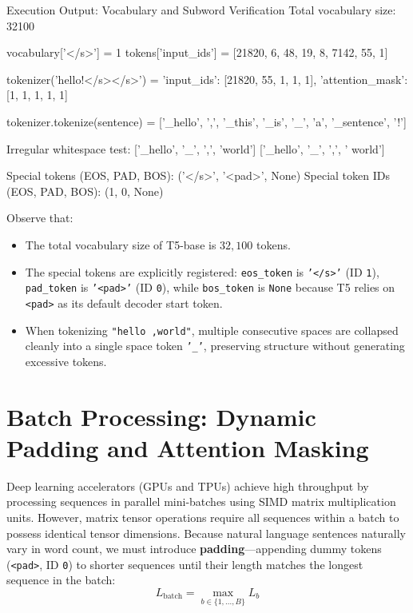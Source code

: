 \documentclass[11pt,a4paper]{article}
\begin{document}
\begin{macterminal}{Execution Output: Vocabulary and Subword Verification}
Total vocabulary size: 32100

vocabulary['</s>'] = 1
tokens['input_ids'] = [21820, 6, 48, 19, 8, 7142, 55, 1]

tokenizer('hello!</s></s>') = {'input_ids': [21820, 55, 1, 1, 1], 'attention_mask': [1, 1, 1, 1, 1]}

tokenizer.tokenize(sentence) = ['_hello', ',', '_this', '_is', '_', 'a', '_sentence', '!']

Irregular whitespace test:
['_hello', '_', ',', 'world']
['_hello', '_', ',', ' world']

Special tokens (EOS, PAD, BOS): ('</s>', '<pad>', None)
Special token IDs (EOS, PAD, BOS): (1, 0, None)
\end{macterminal}

Observe that:
\begin{itemize}
    \item The total vocabulary size of T5-base is $32{,}100$ tokens.
    \item The special tokens are explicitly registered: \texttt{eos\_token} is \texttt{'</s>'} (ID \texttt{1}), \texttt{pad\_token} is \texttt{'<pad>'} (ID \texttt{0}), while \texttt{bos\_token} is \texttt{None} because T5 relies on \texttt{<pad>} as its default decoder start token.
    \item When tokenizing \texttt{"hello    ,world"}, multiple consecutive spaces are collapsed cleanly into a single space token \texttt{'\_'}, preserving structure without generating excessive tokens.
\end{itemize}


\section{Batch Processing: Dynamic Padding and Attention Masking}

Deep learning accelerators (GPUs and TPUs) achieve high throughput by processing sequences in parallel mini-batches using SIMD matrix multiplication units. However, matrix tensor operations require all sequences within a batch to possess identical tensor dimensions. Because natural language sentences naturally vary in word count, we must introduce \textbf{padding}---appending dummy tokens (\texttt{<pad>}, ID \texttt{0}) to shorter sequences until their length matches the longest sequence in the batch:
\begin{equation}
L_{\text{batch}} = \max_{b \in \{1,\dots,B\}} L_b
\end{equation}
\end{document}
